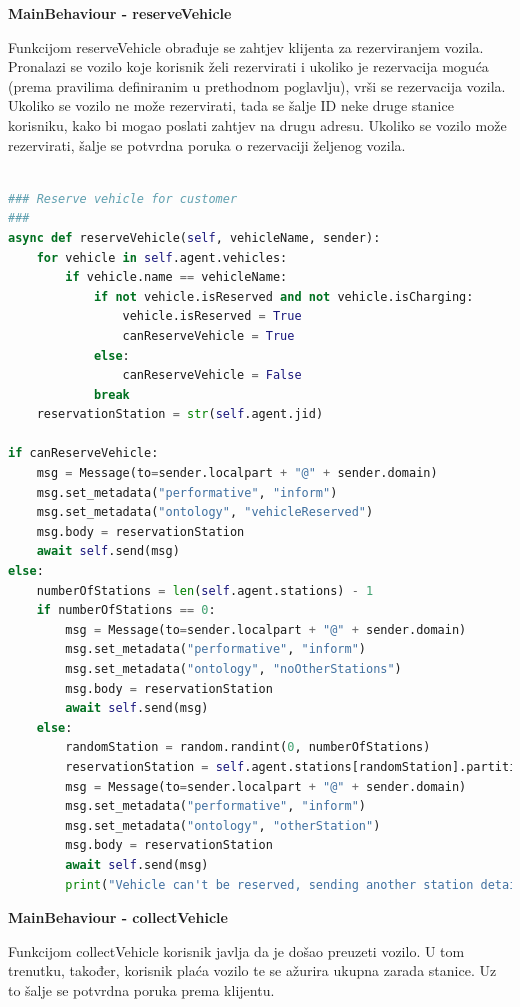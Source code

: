 \documentclass{foi}
\begin{document}
\begin{flushleft}\textbf{MainBehaviour - reserveVehicle}\end{flushleft}

Funkcijom reserveVehicle obrađuje se zahtjev klijenta za rezerviranjem vozila. Pronalazi se vozilo koje korisnik želi rezervirati i ukoliko je rezervacija moguća (prema pravilima definiranim u prethodnom poglavlju), vrši se rezervacija vozila. Ukoliko se vozilo ne može rezervirati, tada se šalje ID neke druge stanice korisniku, kako bi mogao poslati zahtjev na drugu adresu. Ukoliko se vozilo može rezervirati, šalje se potvrdna poruka o rezervaciji željenog vozila.

\begin{lstlisting}[language=Python]

### Reserve vehicle for customer
###
async def reserveVehicle(self, vehicleName, sender):
	for vehicle in self.agent.vehicles:
		if vehicle.name == vehicleName:
			if not vehicle.isReserved and not vehicle.isCharging:
				vehicle.isReserved = True
				canReserveVehicle = True
			else:
				canReserveVehicle = False
			break
	reservationStation = str(self.agent.jid)

if canReserveVehicle:
	msg = Message(to=sender.localpart + "@" + sender.domain)
	msg.set_metadata("performative", "inform")
	msg.set_metadata("ontology", "vehicleReserved")
	msg.body = reservationStation
	await self.send(msg)
else:
	numberOfStations = len(self.agent.stations) - 1
	if numberOfStations == 0:
		msg = Message(to=sender.localpart + "@" + sender.domain)
		msg.set_metadata("performative", "inform")
		msg.set_metadata("ontology", "noOtherStations")
		msg.body = reservationStation
		await self.send(msg) 
	else:
		randomStation = random.randint(0, numberOfStations)
		reservationStation = self.agent.stations[randomStation].partition("@")[0]
		msg = Message(to=sender.localpart + "@" + sender.domain)
		msg.set_metadata("performative", "inform")
		msg.set_metadata("ontology", "otherStation")
		msg.body = reservationStation
		await self.send(msg) 
		print("Vehicle can't be reserved, sending another station details to customer...")

\end{lstlisting}

\begin{flushleft}\textbf{MainBehaviour - collectVehicle}\end{flushleft}

Funkcijom collectVehicle korisnik javlja da je došao preuzeti vozilo. U tom trenutku, također, korisnik plaća vozilo te se ažurira ukupna zarada stanice. Uz to šalje se potvrdna poruka prema klijentu.
\end{document}
